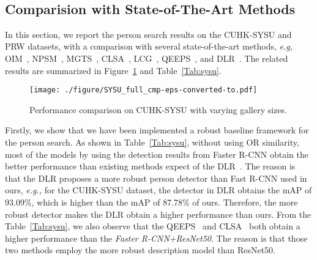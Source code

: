 \documentclass[journal]{IEEEtran}
\begin{document}
\begin{figure*}
\begin{center}
\\
\end{center}
\caption{The effect of objectness term (O), repulsion term (R), and OR similarity (OR) on the CUHK-SYSU dataset with varying gallery sizes.}
\label{Fig:CUHKOr}
\end{figure*}


\subsection{Comparision with State-of-The-Art Methods}
In this section, we report the person search results on the CUHK-SYSU and PRW datasets, with a comparison with several state-of-the-art methods, \emph{e.g,} OIM~\cite{XiaoLWLW17}, NPSM~\cite{LiuFJKZQJY17}, MGTS~\cite{ChenZOYT18}, CLSA~\cite{LanZG18}, LCG~\cite{DBLP:conf/cvpr/YanZNZXY19}, QEEPS~\cite{DBLP:conf/cvpr/MunjalATG19}, and DLR~\cite{han2019re}. The related results are summarized in Figure~\ref{Fig:sysu_cmp} and Table~\ref{Tab:sysu}.
\begin{figure}
\texttt{[image: ./figure/SYSU\_full\_cmp-eps-converted-to.pdf]}
\caption{Performance comparison on CUHK-SYSU with varying gallery sizes.}
\label{Fig:sysu_cmp}
\end{figure}

Firstly, we show that we have been implemented a robust baseline framework for the person search. 
As shown in Table~\ref{Tab:sysu}, without using OR similarity, most of the models by using the detection results from Faster R-CNN obtain the better performance than existing methods expect of the DLR~\cite{han2019re}. 
The reason is that the DLR proposes a more robust person detector than Fast R-CNN used in ours, \emph{e.g.,} for the CUHK-SYSU dataset, the detector in DLR obtains the mAP of 93.09\%, which is higher than the mAP of 87.78\% of ours.
Therefore, the more robust detector makes the DLR obtain a higher performance than ours.
From the Table~\ref{Tab:sysu}, we also observe that the QEEPS~\cite{DBLP:conf/cvpr/MunjalATG19} and CLSA~\cite{LanZG18} both obtain a higher performance than the \emph{Faster R-CNN+ResNet50}.  
The reason is that those two methods employ the more robust description model than ResNet50.
\end{document}
